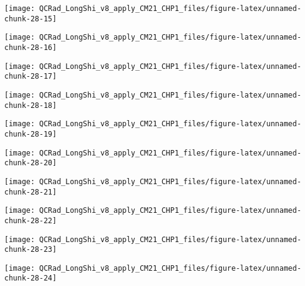 \documentclass[
  10pt,
  a4paper,oneside]{article}
\begin{document}
\begin{center}\texttt{[image: QCRad\_LongShi\_v8\_apply\_CM21\_CHP1\_files/figure-latex/unnamed-chunk-28-15]} \end{center}

\begin{center}\texttt{[image: QCRad\_LongShi\_v8\_apply\_CM21\_CHP1\_files/figure-latex/unnamed-chunk-28-16]} \end{center}

\begin{center}\texttt{[image: QCRad\_LongShi\_v8\_apply\_CM21\_CHP1\_files/figure-latex/unnamed-chunk-28-17]} \end{center}

\begin{center}\texttt{[image: QCRad\_LongShi\_v8\_apply\_CM21\_CHP1\_files/figure-latex/unnamed-chunk-28-18]} \end{center}

\begin{center}\texttt{[image: QCRad\_LongShi\_v8\_apply\_CM21\_CHP1\_files/figure-latex/unnamed-chunk-28-19]} \end{center}

\begin{center}\texttt{[image: QCRad\_LongShi\_v8\_apply\_CM21\_CHP1\_files/figure-latex/unnamed-chunk-28-20]} \end{center}

\begin{center}\texttt{[image: QCRad\_LongShi\_v8\_apply\_CM21\_CHP1\_files/figure-latex/unnamed-chunk-28-21]} \end{center}

\begin{center}\texttt{[image: QCRad\_LongShi\_v8\_apply\_CM21\_CHP1\_files/figure-latex/unnamed-chunk-28-22]} \end{center}

\begin{center}\texttt{[image: QCRad\_LongShi\_v8\_apply\_CM21\_CHP1\_files/figure-latex/unnamed-chunk-28-23]} \end{center}

\begin{center}\texttt{[image: QCRad\_LongShi\_v8\_apply\_CM21\_CHP1\_files/figure-latex/unnamed-chunk-28-24]} \end{center}
\end{document}
